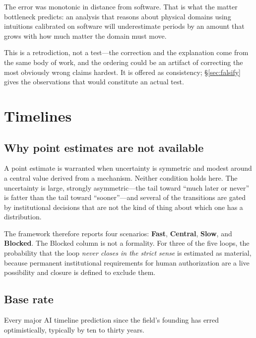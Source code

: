 \documentclass[11pt]{article}
\begin{document}
The error was monotonic in distance from software. That is what the matter bottleneck predicts: an analysis that reasons about physical domains using intuitions calibrated on software will underestimate periods by an amount that grows with how much matter the domain must move.

This is a retrodiction, not a test---the correction and the explanation come from the same body of work, and the ordering could be an artifact of correcting the most obviously wrong claims hardest. It is offered as consistency; \S\ref{sec:falsify} gives the observations that would constitute an actual test.

\section{Timelines}
\label{sec:timelines}

\subsection{Why point estimates are not available}

A point estimate is warranted when uncertainty is symmetric and modest around a central value derived from a mechanism. Neither condition holds here. The uncertainty is large, strongly asymmetric---the tail toward ``much later or never'' is fatter than the tail toward ``sooner''---and several of the transitions are gated by institutional decisions that are not the kind of thing about which one has a distribution.

The framework therefore reports four scenarios: \textbf{Fast}, \textbf{Central}, \textbf{Slow}, and \textbf{Blocked}. The Blocked column is not a formality. For three of the five loops, the probability that the loop \emph{never closes in the strict sense} is estimated as material, because permanent institutional requirements for human authorization are a live possibility and closure is defined to exclude them.

\subsection{Base rate}
\label{sec:baserate}

Every major AI timeline prediction since the field's founding has erred optimistically, typically by ten to thirty years.
\end{document}
